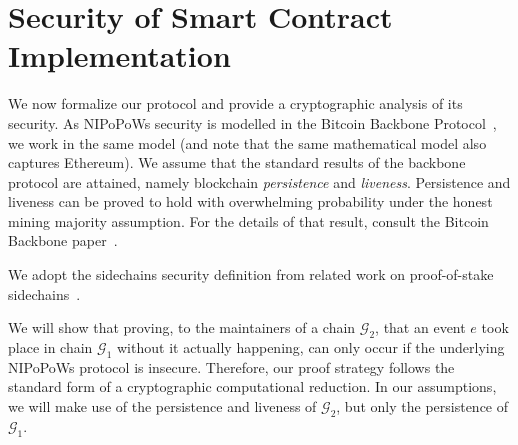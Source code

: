 \section{Security of Smart Contract Implementation}


We now formalize our protocol and provide a cryptographic analysis of its
security. As NIPoPoWs security is modelled in the Bitcoin
Backbone Protocol~\cite{backbone}, we work in the same model (and note
that the same mathematical model also captures Ethereum). We assume that the
standard results of the backbone protocol are attained, namely blockchain
\emph{persistence} and \emph{liveness}. Persistence and liveness can be proved
to hold with overwhelming probability under the honest mining majority
assumption. For the details of that result, consult the Bitcoin Backbone
paper~\cite{backbone}.

We adopt the sidechains security definition from related work on proof-of-stake
sidechains~\cite{pos-sidechains}.

We will show that proving, to the maintainers of a chain $\mathcal{G}_2$, that
an event $e$ took place in chain $\mathcal{G}_1$ without it actually happening,
can only occur if the underlying NIPoPoWs protocol is insecure. Therefore, our
proof strategy follows the standard form of a cryptographic computational
reduction. In our assumptions, we will make use of the persistence and
liveness of $\mathcal{G}_2$, but only the persistence of $\mathcal{G}_1$.

